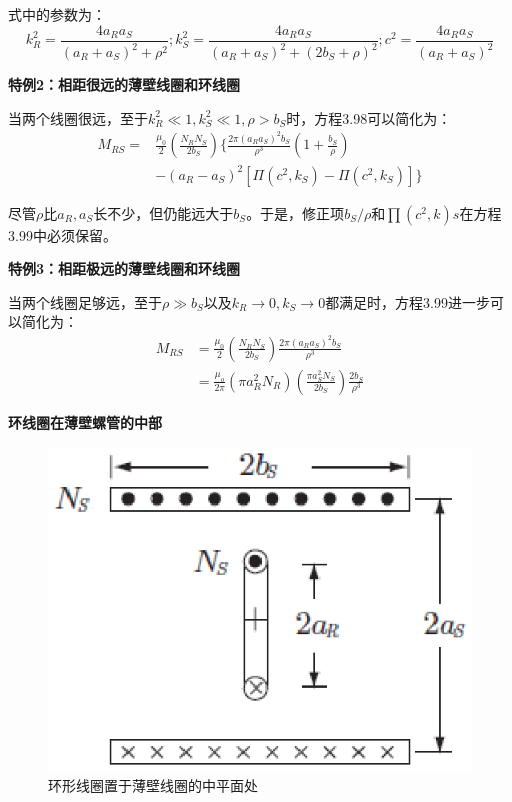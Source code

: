 式中的参数为：
\begin{equation*}
k_R^2=\frac{4a_Ra_S}{(a_R+a_S)^2+\rho^2};k_S^2=\frac{4a_Ra_S}{(a_R+a_S)^2+(2b_S+\rho)^2};c^2=\frac{4a_Ra_S}{(a_R+a_S)^2}%
\end{equation*}

\textbf{特例2：相距很远的薄壁线圈和环线圈} 

  当两个线圈很远，至于$k_R^2 \ll 1, k_S^2\ll 1,\rho > b_S$时，方程3.98可以简化为：
  \begin{equation}
  \begin{split}
M_{RS}=&\frac{\mu_0}{2}(\frac{N_RN_S}{2b_S})\{\frac{2\pi(a_Ra_S)^2b_S}{\rho^3}(1+\frac{b_S}{\rho})\\
&-(a_R-a_S)^2[\Pi(c^2,k_S)-\Pi(c^2,k_S)]\}%
  \end{split}
  \end{equation}
  
尽管$\rho$比$a_R,a_S$长不少，但仍能远大于$b_S$。于是，修正项$b_S/\rho$和$\prod(c^2, k)s$在方程3.99中必须保留。

\textbf{特例3：相距极远的薄壁线圈和环线圈} 

  当两个线圈足够远，至于$\rho \gg b_S$以及$k_R\rightarrow 0,k_S\rightarrow 0$都满足时，方程3.99进一步可以简化为：
 \begin{equation}
\begin{split}
M_{RS}&=\frac{\mu_0}{2}(\frac{N_RN_S}{2b_S})\frac{2\pi(a_Ra_S)^2b_S}{\rho^3}\\
&=\frac{\mu_o}{2\pi}(\pi a_R^2N_R)(\frac{\pi a_S^2N_S}{2b_S})\frac{2b_S}{\rho^3}%
\end{split}
\end{equation}

\textbf{环线圈在薄壁螺管的中部} 
\begin{figure}[htbp]
	\centering
	\includegraphics[scale=0.8]{chpt3/figs/fig3.15.eps}
	\caption{环形线圈置于薄壁线圈的中平面处}
\end{figure}

